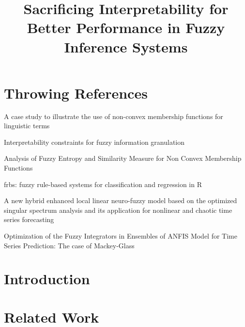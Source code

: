 \documentclass[conference]{IEEEtran}
\begin{document}
\title{Sacrificing Interpretability for Better Performance in Fuzzy Inference Systems}


\author{
  }

\maketitle

\begin{abstract}

\end{abstract}

\IEEEpeerreviewmaketitle

\section{Throwing References}

A case study to illustrate the use of non-convex membership functions for linguistic terms
\cite{garibaldi2004case}

Interpretability constraints for fuzzy information granulation
\cite{mencar2008interpretability}

Analysis of Fuzzy Entropy and Similarity Measure for Non Convex
Membership Functions
\cite{lee2009analysis}

frbs: fuzzy rule-based systems for classification and regression in R
\cite{riza2015frbs}

A new hybrid enhanced local linear neuro-fuzzy model based on the optimized singular spectrum analysis and its application for nonlinear and chaotic time series forecasting
\cite{abdollahzade2015new}

Optimization of the Fuzzy Integrators in Ensembles of ANFIS Model for
Time Series Prediction: The case of Mackey-Glass
\cite{soto2015optimization}

\section{Introduction}
\label{introduction}

\section{Related Work}
\label{related-work}
\end{document}
